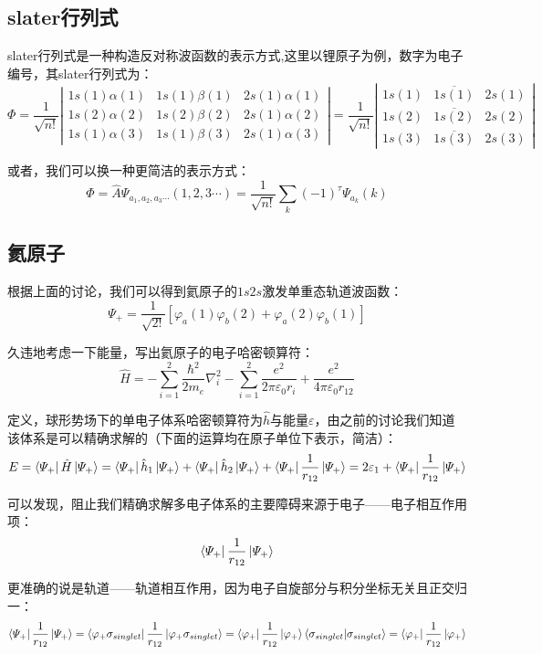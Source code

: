 \subsection{slater行列式}
slater行列式是一种构造反对称波函数的表示方式,这里以锂原子为例，数字为电子编号，其slater行列式为：
\[\varPhi=\frac{1}{\sqrt{n!}}
\left |
\begin{array}{lll}
1s(1)\alpha(1) & 1s(1)\beta(1) & 2s(1)\alpha(1) \\
1s(2)\alpha(2) & 1s(2)\beta(2) & 2s(1)\alpha(2) \\
1s(1)\alpha(3) & 1s(1)\beta(3) & 2s(1)\alpha(3)
\end{array}
\right |
=\frac{1}{\sqrt{n!}}
\left |
\begin{array}{lll}
1s(1) & \overline{1s(1)} & 2s(1) \\
1s(2) & \overline{1s(2)} & 2s(2) \\
1s(3) & \overline{1s(3)} & 2s(3)
\end{array}
\right |
\]

或者，我们可以换一种更简洁的表示方式：
\[\varPhi=\hat{A}\varPsi_{a_1,a_2,a_3 \cdots}(1,2,3\cdots)=\frac{1}{\sqrt{n!}}\sum_k(-1)^{\tau}\varPsi_{a_k}(k)\]

\subsection{氦原子}
根据上面的讨论，我们可以得到氦原子的$1s2s$激发单重态轨道波函数：
\[\varPsi_{+}=\frac{1}{\sqrt{2!}}[\varphi_a(1)\varphi_b(2)+\varphi_a(2)\varphi_b(1)]\]

久违地考虑一下能量，写出氦原子的电子哈密顿算符：
\[\hat{H}=-\sum_{i=1}^2\frac{\hbar^2}{2m_e}\nabla^2_i-\sum_{i=1}^2\frac{e^2}{2 \pi \varepsilon_0 r_{i}}+\frac{e^2}{4 \pi \varepsilon_0 r_{12}}\]

定义，球形势场下的单电子体系哈密顿算符为$\hat{h}$与能量$\varepsilon$，由之前的讨论我们知道该体系是可以精确求解的（下面的运算均在原子单位下表示，简洁）：
\[E=\bra{\varPsi_{+}}\hat{H}\ket{\varPsi_{+}}=\bra{\varPsi_{+}}\hat{h}_1\ket{\varPsi_{+}}+\bra{\varPsi_{+}}\hat{h}_2\ket{\varPsi_{+}}+\bra{\varPsi_{+}}\frac{1}{r_{12}}\ket{\varPsi_{+}}=2\varepsilon_{1}+\bra{\varPsi_{+}}\frac{1}{r_{12}}\ket{\varPsi_{+}}\]

可以发现，阻止我们精确求解多电子体系的主要障碍来源于电子——电子相互作用项：
\[\bra{\varPsi_{+}}\frac{1}{r_{12}}\ket{\varPsi_{+}}\]

更准确的说是轨道——轨道相互作用，因为电子自旋部分与积分坐标无关且正交归一：
\[\bra{\varPsi_{+}}\frac{1}{r_{12}}\ket{\varPsi_{+}}=\bra{\varphi_{+}\sigma_{singlet}}\frac{1}{r_{12}}\ket{\varphi_{+}\sigma_{singlet}}=\bra{\varphi_{+}}\frac{1}{r_{12}}\ket{\varphi_{+}}\bra{\sigma_{singlet}}\ket{\sigma_{singlet}}=\bra{\varphi_{+}}\frac{1}{r_{12}}\ket{\varphi_{+}}\]

